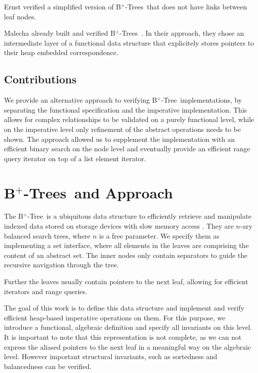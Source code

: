 \documentclass[a4paper,UKenglish,cleveref, autoref, thm-restate]{lipics-v2021}
\newcommand{\btree}{B$^+$-Tree}
\newcommand{\btrees}{B$^+$-Trees}
\begin{document}
Ernst verified a simplified version of \btrees\ that does
not have links between leaf nodes.

Malecha already built and verified \btrees\ \cite{}.
In their approach, they chose an intermediate layer of a functional
data structure that explicitely stores pointers to their heap embedded
correspondence.

\subsection{Contributions}
\label{sec:contributions}

We provide an alternative approach to verifying \btree\ implementations,
by separating the functional specification and the imperative implementation.
This allows for complex relationships to be validated on a purely
functional level, while on the imperative level
only refinement of the abstract operations needs to be shown.
The approach allowed us to supplement the implementation
with an efficient binary search on the node level
and eventually provide an efficient range query iterator
on top of a list element iterator.


\section{\btrees\ and Approach}
\label{sec:approach}

The \btree\ is a ubiquitous data structure to efficiently retrieve and manipulate
indexed data stored on storage devices with slow memory access \cite{DBLP:journals/csur/Comer79}.
They are $n$-ary balanced search trees, where $n$ is a free parameter.
We specify them as implementing a set interface,
where all elements in the leaves are comprising the content of an abstract set.
The inner nodes only contain separators to guide the recursive navigation through the tree.

Further the leaves usually contain pointers
to the next leaf, allowing for efficient iterators and range queries.

The goal of this work is to define this data structure
and implement and verify efficient heap-based imperative operations on them.
For this purpose, we introduce a functional, algebraic definition and
specify all invariants on this level.
It is important to note that this representation is not complete,
as we can not express the aliased pointers to the next leaf in a meaningful
way on the algebraic level.
However important structural invariants, such as sortedness and balancedness
can be verified.
\end{document}
